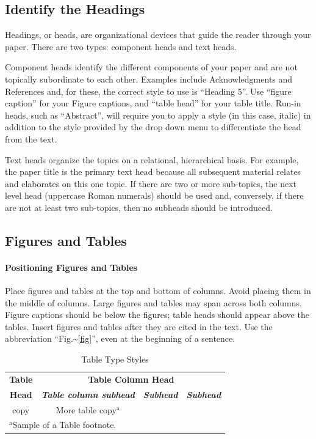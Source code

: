 \documentclass[conference]{IEEEtran}
\begin{document}
\subsection{Identify the Headings}
\label{sec:org6329478}
Headings, or heads, are organizational devices that guide the reader through your paper. There are two types: component heads and text heads.

Component heads identify the different components of your paper and are not topically subordinate to each other. Examples include Acknowledgments and References and, for these, the correct style to use is ``Heading 5''. Use 
``figure caption'' for your Figure captions, and ``table head'' for your table title. Run-in heads, such as ``Abstract'', will require you to apply a style (in this case, italic) in addition to the style provided by the drop down menu to differentiate the head from the text.

Text heads organize the topics on a relational, hierarchical basis. For example, the paper title is the primary text head because all subsequent material relates and elaborates on this one topic. If there are two or more sub-topics, the next level head (uppercase Roman numerals) should be used and, conversely, if there are not at least two sub-topics, then no subheads should be introduced.

\subsection{Figures and Tables}
\label{sec:org90c61d4}
   \paragraph{Positioning Figures and Tables} Place figures and tables at the top and 
bottom of columns. Avoid placing them in the middle of columns. Large figures and tables may span across both columns. Figure captions should be below the figures; table heads should appear above the tables. Insert figures and tables after they are cited in the text. Use the abbreviation ``Fig.\textasciitilde{}\ref{fig}'', even at the beginning of a sentence.

\begin{table}[htbp]
\caption{Table Type Styles}
\begin{center}
\begin{tabular}{|c|c|c|c|}
\hline
\textbf{Table}&\multicolumn{3}{|c|}{\textbf{Table Column Head}} \\
\cline{2-4} 
\textbf{Head} & \textbf{\textit{Table column subhead}}& \textbf{\textit{Subhead}}& \textbf{\textit{Subhead}} \\
\hline
copy& More table copy$^{\mathrm{a}}$& &  \\
\hline
\multicolumn{4}{l}{$^{\mathrm{a}}$Sample of a Table footnote.}
\end{tabular}
\label{tab1}
\end{center}
\end{table}
\end{document}
